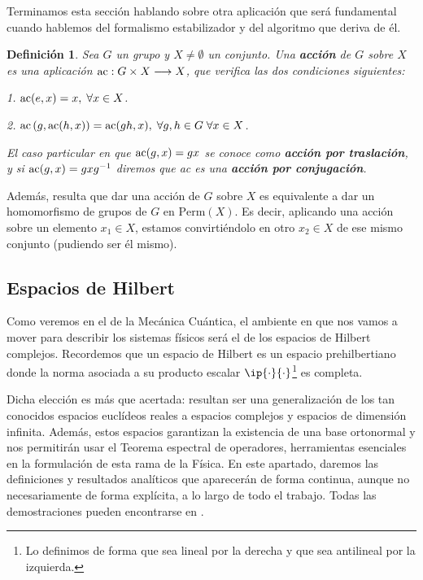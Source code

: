 \documentclass[11pt,a4paper,twoside,pdf]{article}
\numberwithin{equation}{section}
\newtheorem{definition}{Definición}
\begin{document}
	Terminamos esta sección hablando sobre otra aplicación que será fundamental cuando hablemos del formalismo estabilizador y del algoritmo que deriva de él.
	
		\begin{definition}
			Sea $G$ un grupo y $X\ne\emptyset$ un conjunto. Una \textbf{acción} de $G$ sobre $X$ es una aplicación $\textup{ac}: G\times X \longrightarrow X$, que verifica las dos condiciones siguientes:
			
				 1. $\textup{ac}(e,x)=x, \; \forall x \in X$.
			
				 2. $\textup{ac}\left( g , \textup{ac}(h,x) \right) = \textup{ac}(gh,x) , \; \forall g, h \in G \; \forall x \in X$.
				 
			\noindent El caso particular en que $\textup{ac}(g,x)=gx$ se conoce como \textbf{acción por traslación}, y si $\textup{ac}(g,x)=gxg^{-1}$ diremos que \textup{ac} es una \textbf{acción por conjugación}.	 
		\end{definition}	
	
	Además, resulta que dar una acción de $G$ sobre $X$ es equivalente a dar un homomorfismo de grupos de $G$ en $\text{Perm}(X)$. Es decir, aplicando una acción sobre un elemento $x_1 \in X$, estamos convirtiéndolo en otro $x_2 \in X$ de ese mismo conjunto (pudiendo ser él mismo).
	
	\subsection{Espacios de Hilbert}
	
	Como veremos en el  de la Mecánica Cuántica, el ambiente en que nos vamos a mover para describir los sistemas físicos será el de los espacios de Hilbert complejos. Recordemos que un espacio de Hilbert es un espacio prehilbertiano donde la norma asociada a su producto escalar $\ip{\cdot}{\cdot}$\footnote{Lo definimos de forma que sea lineal por la derecha y que sea antilineal por la izquierda.} es completa.
	
	Dicha elección es más que acertada: resultan ser una generalización de los tan conocidos espacios euclídeos reales a espacios complejos y espacios de dimensión infinita. Además, estos espacios garantizan la existencia de una base ortonormal y nos permitirán usar el Teorema espectral de operadores, herramientas esenciales en la formulación de esta rama de la Física.
	En este apartado, daremos las definiciones y resultados analíticos que aparecerán de forma continua, aunque no necesariamente de forma explícita, a lo largo de todo el trabajo. Todas las demostraciones pueden encontrarse en \cite{Hilbert}. 
	
\end{document}
